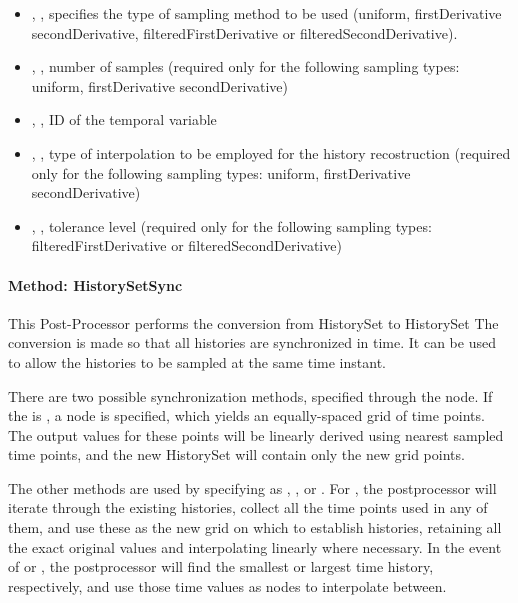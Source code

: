 \begin{itemize}
   \item {}, , specifies the type of sampling method to be used (uniform, firstDerivative secondDerivative, filteredFirstDerivative or
   filteredSecondDerivative).
   \item {}, , number of samples (required only for the following sampling types: uniform, firstDerivative secondDerivative)
   \item {}, , ID of the temporal variable
   \item {}, , type of interpolation to be employed for the history recostruction (required only for the following sampling types: uniform,
   firstDerivative secondDerivative)
   \item {}, , tolerance level (required only for the following sampling types: filteredFirstDerivative or filteredSecondDerivative)
\end{itemize}

\paragraph{Method: HistorySetSync}
This Post-Processor performs the conversion from HistorySet to HistorySet
The conversion is made so that all histories are synchronized in time.
It can be used to allow the histories to be sampled at the same time instant.

There are two possible synchronization methods, specified through the  node.  If the
 is , a  node is specified,
which yields an equally-spaced grid of time points. The output values for these points will be linearly derived
using nearest sampled time points, and the new HistorySet will contain only the new grid points.

The other methods are used by specifying  as , , or
.  For , the postprocessor will iterate through the
existing histories, collect all the time points used in any of them, and use these as the new grid on which to
establish histories, retaining all the exact original values and interpolating linearly where necessary.
In the event of  or , the postprocessor will find the smallest or largest time
history, respectively, and use those time values as nodes to interpolate between.

